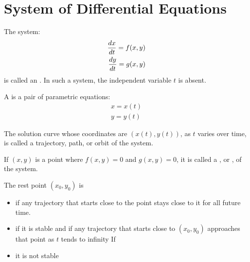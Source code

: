 \chapter{System of Differential Equations}

  \par The system:
  \begin{align*}
    \dfrac{d x}{d t} = f(x, y) \\
    \dfrac{d y}{d t} = g(x, y)
  \end{align*}
  is called an . In such a system, the independent
  variable $t$ is absent.
  \par A  is a pair of parametric equations:
    \begin{align*}
      x = x(t) \\
      y = y(t)     
    \end{align*}
  \par The solution curve whose coordinates are $(x(t), y(t))$, as $t$ varies over time, is called a trajectory, path, or orbit of the system.
  \par If $(x, y)$ is a point where  $f(x, y) = 0$ and $g(x, y) = 0$, it is called a , or , of the system.
  \par The rest point $(x_0, y_0)$ is
    \begin{itemize}
      \item {} if any trajectory that starts close to the point stays close to it for all future time.
      \item {} if it is stable and if any trajectory that starts close to $(x_0, y_0)$ approaches that point as $t$ tends to infinity
      If
      \item {} it is not stable
    \end{itemize}

